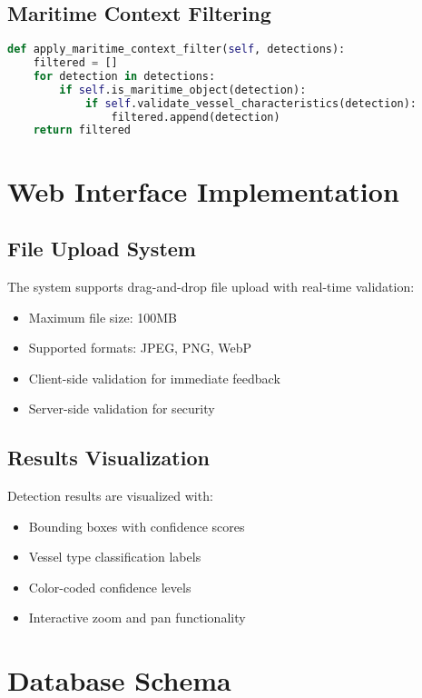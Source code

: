 \documentclass[12pt,a4paper]{report}
\begin{document}
\subsection{Maritime Context Filtering}
\begin{lstlisting}[language=Python, caption=Maritime Context Filter]
def apply_maritime_context_filter(self, detections):
    filtered = []
    for detection in detections:
        if self.is_maritime_object(detection):
            if self.validate_vessel_characteristics(detection):
                filtered.append(detection)
    return filtered
\end{lstlisting}

\section{Web Interface Implementation}

\subsection{File Upload System}
The system supports drag-and-drop file upload with real-time validation:
\begin{itemize}
    \item Maximum file size: 100MB
    \item Supported formats: JPEG, PNG, WebP
    \item Client-side validation for immediate feedback
    \item Server-side validation for security
\end{itemize}

\subsection{Results Visualization}
Detection results are visualized with:
\begin{itemize}
    \item Bounding boxes with confidence scores
    \item Vessel type classification labels
    \item Color-coded confidence levels
    \item Interactive zoom and pan functionality
\end{itemize}

\section{Database Schema}
\end{document}
